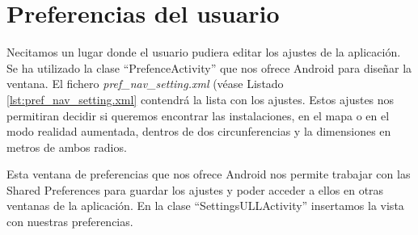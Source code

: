     
\section{Preferencias del usuario}

Necitamos un lugar donde el usuario pudiera editar los ajustes de la aplicación. Se ha utilizado la clase ``PrefenceActivity'' que nos ofrece Android para diseñar la ventana. El fichero \textit{pref\_nav\_setting.xml} (véase Listado \ref{lst:pref_nav_setting.xml} contendrá la lista con los ajustes. Estos ajustes nos permitiran decidir si queremos encontrar las instalaciones, en el mapa o en el modo realidad aumentada, dentros de dos circunferencias y la dimensiones en metros de ambos radios. 



Esta ventana de preferencias que nos ofrece Android nos permite trabajar con las Shared Preferences para guardar los ajustes y poder acceder a ellos en otras ventanas de la aplicación. En la clase ``SettingsULLActivity'' insertamos la vista con nuestras preferencias.



